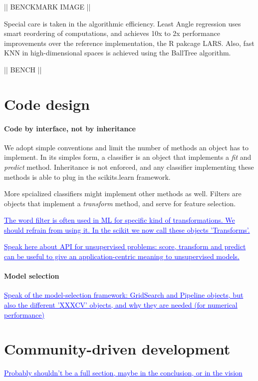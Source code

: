 \documentclass[twoside,11pt]{article}
\newcommand{\GAEL}[1]{\textcolor{blue}{\uline{#1}}}
\begin{document}
|| BENCKMARK IMAGE ||


Special care is taken in the algorithmic efficiency. Least Angle
regression uses smart reordering of computations, and achieves 10x to
2x performance improvements over the reference implementation, the R
pakcage LARS. Also, fast KNN in high-dimensional spaces is achieved
using the BallTree algorithm.

|| BENCH ||

\section{Code design}

\paragraph{Code by interface, not by inheritance}
%
We adopt simple conventions and limit the number of methods an object
has to implement. In its simples form, a classifier is an object that
implements a \emph{fit} and \emph{predict} method. Inheritance is not
enforced, and any classifier implementing these methods is able to
plug in the scikits.learn framework.


More spcialized classifiers might implement other methods as
well. Filters are objects that implement a \emph{transform} method,
and serve for feature selection.

\GAEL{The word filter is often used in ML for specific kind of
transformations. We should refrain from using it. In the scikit we now
call these objects 'Transforms'. }

\GAEL{Speak here about API for unsupervised problems: score, transform and
predict can be useful to give an application-centric meaning to
unsupervised models.}

\paragraph{Model selection}

\GAEL{Speak of the model-selection framework: GridSearch and Pipeline
objects, but also the different 'XXXCV' objects, and why they are needed
(for numerical performance)}

\section{Community-driven development}

\GAEL{Probably shouldn't be a full section, maybe in the conclusion, or
in the vision}
\end{document}
